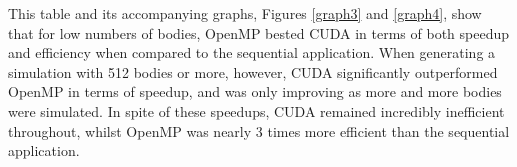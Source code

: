 \documentclass[12pt,journal,transmag]{IEEEtran}
\begin{document}
	\begin{table}[!h]
		\caption{Algorithmic Speedup and Efficiency Comparison}
		\label{efficiencytable}
		\centering
	\end{table}

	This table and its accompanying graphs, Figures \ref{graph3} and \ref{graph4}, show that for low numbers of bodies, OpenMP bested CUDA in terms of both speedup and efficiency when compared to the sequential application. When generating a simulation with 512 bodies or more, however, CUDA significantly outperformed OpenMP in terms of speedup, and was only improving as more and more bodies were simulated. In spite of these speedups, CUDA remained incredibly inefficient throughout, whilst OpenMP was nearly 3 times more efficient than the sequential application. 
\end{document}
